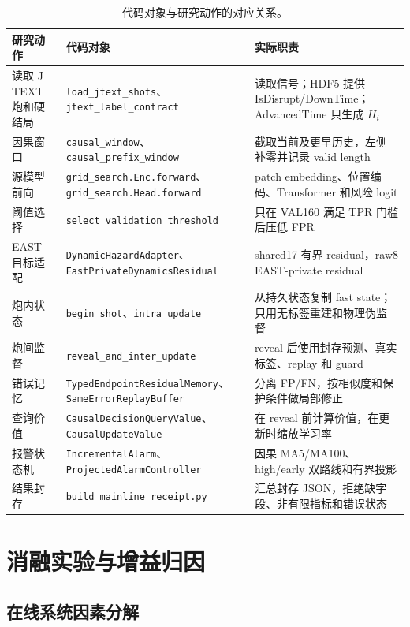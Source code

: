 \documentclass[11pt,a4paper]{article}
\newcommand{\code}[1]{\texttt{\small #1}}
\begin{document}
\begin{table}[H]
\centering
\caption{代码对象与研究动作的对应关系。}
\small
\begin{tabularx}{\textwidth}{p{31mm} p{80mm} Y}
\toprule
研究动作 & 代码对象 & 实际职责\\
\midrule
读取 J-TEXT 炮和硬结局 &
\code{load\_jtext\_shots}、\code{jtext\_label\_contract} &
读取信号；HDF5 提供 IsDisrupt/DownTime；AdvancedTime 只生成 \(H_i\)\\
因果窗口 &
\code{causal\_window}、\code{causal\_prefix\_window} &
截取当前及更早历史，左侧补零并记录 valid length\\
源模型前向 &
\code{grid\_search.Enc}\allowbreak\code{.forward}、\code{grid\_search.Head}\allowbreak\code{.forward} &
patch embedding、位置编码、Transformer 和风险 logit\\
阈值选择 &
\code{select\_validation\_threshold} &
只在 VAL160 满足 TPR 门槛后压低 FPR\\
EAST 目标适配 &
\code{DynamicHazardAdapter}、\code{EastPrivateDynamics}\allowbreak\code{Residual} &
shared17 有界 residual，raw8 EAST-private residual\\
炮内状态 &
\code{begin\_shot}、\code{intra\_update} &
从持久状态复制 fast state；只用无标签重建和物理伪监督\\
炮间监督 &
\code{reveal\_and\_inter\_update} &
reveal 后使用封存预测、真实标签、replay 和 guard\\
错误记忆 &
\code{TypedEndpoint}\allowbreak\code{ResidualMemory}、\code{SameError}\allowbreak\code{ReplayBuffer} &
分离 FP/FN，按相似度和保护条件做局部修正\\
查询价值 &
\code{CausalDecision}\allowbreak\code{QueryValue}、\code{CausalUpdateValue} &
在 reveal 前计算价值，在更新时缩放学习率\\
报警状态机 &
\code{IncrementalAlarm}、\code{ProjectedAlarm}\allowbreak\code{Controller} &
因果 MA5/MA100、high/early 双路线和有界投影\\
结果封存 &
\code{build\_mainline\_receipt.py} &
汇总封存 JSON，拒绝缺字段、非有限指标和错误状态\\
\bottomrule
\end{tabularx}
\end{table}

\section{消融实验与增益归因}

\subsection{在线系统因素分解}
\end{document}
